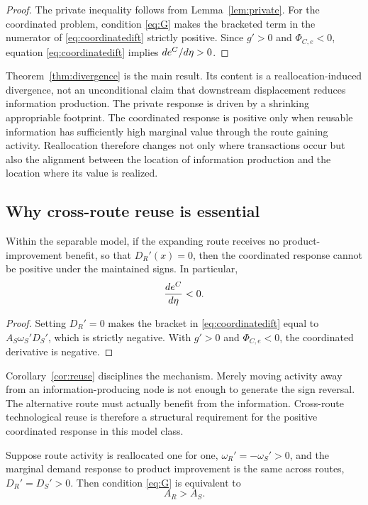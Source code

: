 \begin{proof}
The private inequality follows from Lemma~\ref{lem:private}. For the coordinated problem, condition \eqref{eq:G} makes the bracketed term in the numerator of \eqref{eq:coordinatedift} strictly positive. Since $g'>0$ and $\Phi_{C,e}<0$, equation \eqref{eq:coordinatedift} implies $de^{C}/d\eta>0$.
\end{proof}

Theorem~\ref{thm:divergence} is the main result. Its content is a reallocation-induced divergence, not an unconditional claim that downstream displacement reduces information production. The private response is driven by a shrinking appropriable footprint. The coordinated response is positive only when reusable information has sufficiently high marginal value through the route gaining activity. Reallocation therefore changes not only where transactions occur but also the alignment between the location of information production and the location where its value is realized.

\subsection{Why cross-route reuse is essential}

\begin{corollary}\label{cor:reuse}
Within the separable model, if the expanding route receives no product-improvement benefit, so that $D_R'(x)=0$, then the coordinated response cannot be positive under the maintained signs. In particular,
\[
    \frac{de^{C}}{d\eta}<0.
\]
\end{corollary}

\begin{proof}
Setting $D_R'=0$ makes the bracket in \eqref{eq:coordinatedift} equal to $A_S\omega_S'D_S'$, which is strictly negative. With $g'>0$ and $\Phi_{C,e}<0$, the coordinated derivative is negative.
\end{proof}

Corollary~\ref{cor:reuse} disciplines the mechanism. Merely moving activity away from an information-producing node is not enough to generate the sign reversal. The alternative route must actually benefit from the information. Cross-route technological reuse is therefore a structural requirement for the positive coordinated response in this model class.

\begin{corollary}\label{cor:oneforone}
Suppose route activity is reallocated one for one, $\omega_R'=-\omega_S'>0$, and the marginal demand response to product improvement is the same across routes, $D_R'=D_S'>0$. Then condition \eqref{eq:G} is equivalent to
\[
    A_R>A_S.
\]
\end{corollary}

